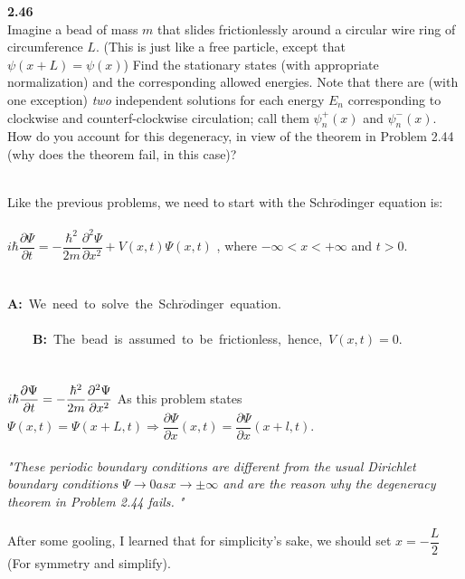 \documentclass[fleqn]{article}
\begin{document}
  \textbf{2.46}
  \\
  Imagine a bead of mass $m$ that slides frictionlessly around a circular wire ring of circumference $L$. 
  (This is just like a free particle, except that $\psi(x+L)=\psi(x)$) Find the stationary states (with
  appropriate normalization) and the corresponding allowed energies. Note that there are (with one exception)
  \emph{two} independent solutions for each energy $E_n$ corresponding to clockwise and counterf-clockwise
  circulation; call them $\psi^+_n(x)$ and $\psi^-_n(x)$. How do you account for this degeneracy, in
  view of the theorem in Problem 2.44 (why does the theorem fail, in this case)?

  \textcolor{hwColor}{
    \\
    Like the previous problems, we need to start with the Schr$\ddot{o}$dinger equation is: \\
    \\
    $
      i\hbar \dfrac{\partial \Psi}{\partial t}=-\dfrac{\hbar^2}{2m}\dfrac{\partial^2 \Psi}{\partial x^2}+V(x,t) \Psi(x,t)
    $
    , where $-\infty<x<+\infty$ and $t>0$. \\
    \\
    \\
    \textbf{A:} We need to solve the Schr$\ddot{o}$dinger equation. \\ 
    \\
    \textbf{B:} The bead is assumed to be frictionless, hence, $V(x,t)=0$. \\
    \\
    \\
    $
      i\hbar \dfrac{\partial \Psi}{\partial t}=-\dfrac{\hbar^2}{2m}\dfrac{\partial^2 \Psi}{\partial x^2} \\ \\
    $
    As this problem states $\Psi(x,t)=\Psi(x+L,t) \Longrightarrow \dfrac{\partial \Psi}{\partial x}(x,t)=\dfrac{\partial \Psi}{\partial x}(x+l, t)$. \\ \\
    \emph{"These periodic boundary conditions are different from the usual Dirichlet boundary conditions
    $\Psi \rightarrow 0 as x \rightarrow \pm \infty$ and are the reason why the degeneracy theorem in Problem 2.44 fails.
    "} \\ \\
    After some gooling, I learned that for simplicity's sake, we should set $x=-\dfrac{L}{2}$ (For symmetry and simplify). \\
    \\
}
\end{document}
